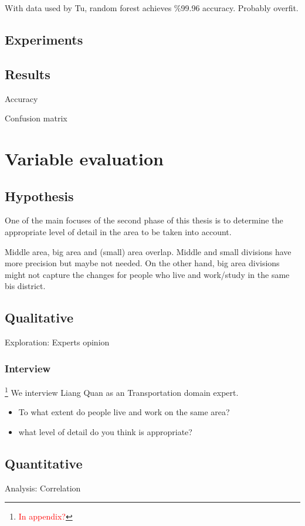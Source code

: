 \documentclass{article}
\newcommand{\selfnote}[1]{\footnote{\textcolor{red}{#1}}}
\begin{document}
With data used by Tu\cite{tu2016impact}, random forest achieves \%99.96 accuracy. Probably overfit.

\subsection{Experiments}

\subsection{Results}

Accuracy

Confusion matrix


\newpage
\section{Variable evaluation}
\subsection{Hypothesis}
One of the main focuses of the second phase of this thesis is to determine the appropriate level of detail in the area to be taken into account. 

Middle area, big area and (small) area overlap. Middle and small divisions have more precision but maybe not needed. On the other hand, big area divisions might not capture the changes for people who live and work/study in the same bis district. 

\subsection{Qualitative}
Exploration: Experts opinion

\subsubsection{Interview}
\selfnote{In appendix?}
We interview Liang Quan as an Transportation domain expert. 

\begin{itemize}
\item To what extent do people live and work on the same area?
\item what level of detail do you think is appropriate?
\end{itemize}

\subsection{Quantitative}
Analysis: Correlation
\end{document}
